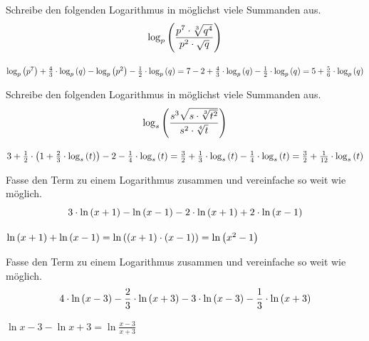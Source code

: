 \documentclass[11pt]{exam}
\begin{document}
\begin{questions}
\question[2]
Schreibe den folgenden Logarithmus in möglichst viele Summanden aus.
\[\log{p}{\frac{p^7\*\sqrt[3]{q^4}}{p^2\*\sqrt{q}}}\]
{\begin{solution}
		$\log{p}{p^7}+\frac{4}{3}\*\log{p}{q}-\log{p}{p^2}-\frac{1}{2}\*\log{p}{q}=7-2+\frac{4}{3}\*\log{p}{q}-\frac{1}{2}\*\log{p}{q}=5+\frac{5}{6}\*\log{p}{q}$
\end{solution}}
{}

\question[2]
Schreibe den folgenden Logarithmus in möglichst viele Summanden aus.
\[\log{s}{\frac{s^3\sqrt{s\*\sqrt[3]{t^2}}}{s^2\*\sqrt[4]{t}}}\]
{\begin{solution}
		$3+\frac{1}{2}\*\left(1+\frac{2}{3}\*\log{s}{t}\right)-2-\frac{1}{4}\*\log{s}{t}=\frac{3}{2}+\frac{1}{3}\*\log{s}{t}-\frac{1}{4}\*\log{s}{t}=\frac{3}{2}+\frac{1}{12}\*\log{s}{t}$
\end{solution}}
{}

\question[2]
Fasse den Term zu einem Logarithmus zusammen und vereinfache so weit wie möglich. \[3\*\ln{x+1}-\ln{x-1}-2\*\ln{x+1}+2\*\ln{x-1}\]
{\begin{solution}
		$\ln{x+1}+\ln{x-1}=\ln{(x+1)\*(x-1)}=\ln{x^2-1}$
\end{solution}}
{}

\question[2]
Fasse den Term zu einem Logarithmus zusammen und vereinfache so weit wie möglich. \[4\*\ln{x-3}-\frac{2}{3}\*\ln{x+3}-3\*\ln{x-3}-\frac{1}{3}\*\ln{x+3}\]
{\begin{solution}
		$\ln{x-3}-\ln{x+3}=\ln{\frac{x-3}{x+3}}$
\end{solution}}
{}

\noaddpoints
\question[\totalpoints]
\addpoints
\begin{minipage}{0.6\linewidth}
\end{minipage}
\end{questions}
\end{document}

